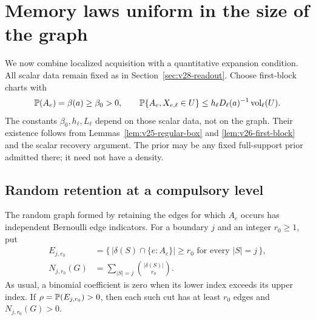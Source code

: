 \section{Memory laws uniform in the size of the graph}
\label{sec:v28-growing}
We now combine localized acquisition with a quantitative expansion
condition. All scalar data remain fixed as in
Section~\ref{sec:v28-readout}. Choose first-block charts with
\[
 \mathbb P(A_e)=\beta(a)\ge\beta_0>0,\qquad
 \mathbb P\{A_e,X_{e,\ell}\in U\}
            \le h_\ell D_\ell(a)^{-1}\operatorname{vol}_\ell(U).
\]
The constants $\beta_0,h_\ell,L_\ell$ depend on those scalar data,
not on the graph. Their existence follows from
Lemmas~\ref{lem:v25-regular-box} and \ref{lem:v26-first-block} and
the scalar recovery argument. The prior may be any fixed full-support
prior admitted there; it need not have a density.

\subsection{Random retention at a compulsory level}
The random graph formed by retaining the edges for which $A_e$ occurs
has independent Bernoulli edge indicators. For a boundary $j$ and an
integer $r_0\ge1$, put
\begin{equation}\label{eq:v28-retained-cut}
 \begin{split}
 E_{j,r_0}&=\{\,|\delta(S)\cap\{e:A_e\}|\ge r_0
                              \text{ for every }|S|=j\,\},\\
 N_{j,r_0}(G)&=\sum_{|S|=j}\binom{|\delta(S)|}{r_0}.
 \end{split}
\end{equation}
As usual, a binomial coefficient is zero when its lower index exceeds
its upper index. If $\rho=\mathbb P(E_{j,r_0})>0$, then each such cut has
at least $r_0$ edges and $N_{j,r_0}(G)>0$.

